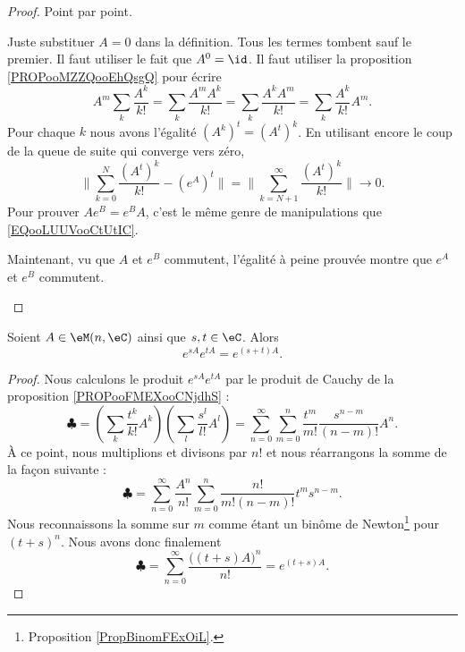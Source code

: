 \begin{proof}
	Point par point.
	\begin{subproof}
		Juste substituer \( A=0\) dans la définition. Tous les termes tombent sauf le premier. Il faut utiliser le fait que \( A^0=\id\).
		Il faut utiliser la proposition \ref{PROPooMZZQooEhQsgQ} pour écrire
		\begin{equation}        \label{EQooLUUVooCtUtIC}
			A^m\sum_k\frac{ A^k }{ k! }=\sum_k\frac{ A^mA^k }{ k! }=\sum_{k}\frac{ A^kA^m }{ k! }=\sum_k\frac{ A^k }{ k! }A^m.
		\end{equation}
		Pour chaque \( k\) nous avons l'égalité \( (A^k)^t=(A^t)^k\). En utilisant encore le coup de la queue de suite qui converge vers zéro,
		\begin{equation}
			\| \sum_{k=0}^N\frac{ (A^t)^k }{ k! }-( e^{A})^t \|=\| \sum_{k=N+1}^{\infty}\frac{ (A^t)^k }{ k! } \|\to 0.
		\end{equation}
		Pour prouver \( A e^{B}= e^{B}A\), c'est le même genre de manipulations que \eqref{EQooLUUVooCtUtIC}.

		Maintenant, vu que \( A\) et \( e^B\) commutent, l'égalité à peine prouvée montre que \(  e^{A}\) et \(  e^{B}\) commutent.
	\end{subproof}
\end{proof}

\begin{proposition}       \label{PROPooKDKDooCUpGzE}
	Soient \( A\in \eM(n,\eC)\) ainsi que \( s,t\in \eC\). Alors
	\begin{equation}
		e^{sA} e^{tA} = e^{(s+t)A}.
	\end{equation}
\end{proposition}

\begin{proof}
	Nous calculons le produit \( e^{sA} e^{tA}\) par le produit de Cauchy de la proposition \ref{PROPooFMEXooCNjdhS} :
	\begin{equation}
		\clubsuit = \left( \sum_k\frac{ t^k }{ k! }A^k \right)\left( \sum_l\frac{ s^l }{ l! }A^l \right)=\sum_{n=0}^{\infty}\sum_{m=0}^n\frac{ t^m }{ m! }\frac{ s^{n-m} }{ (n-m)! }A^n.
	\end{equation}
	À ce point, nous multiplions et divisons par \( n!\) et nous réarrangons la somme de la façon suivante :
	\begin{equation}
		\clubsuit = \sum_{n=0}^{\infty}\frac{ A^n }{ n! }\sum_{m=0}^n\frac{ n! }{ m!(n-m)! }t^ms^{n-m}.
	\end{equation}
	Nous reconnaissons la somme sur \( m\) comme étant un binôme de Newton\footnote{Proposition \ref{PropBinomFExOiL}.} pour \( (t+s)^n\). Nous avons donc finalement
	\begin{equation}
		\clubsuit = \sum_{n=0}^{\infty}\frac{ \big( (t+s)A \big)^n }{ n! }= e^{(t+s)A}.
	\end{equation}
\end{proof}

